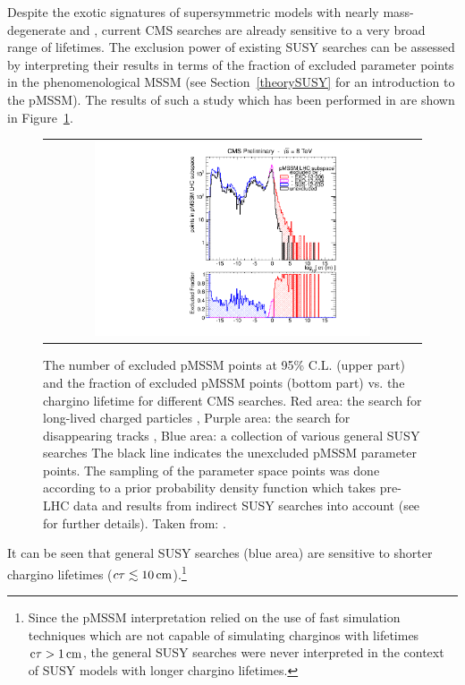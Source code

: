 Despite the exotic signatures of supersymmetric models with nearly mass-degenerate \chipm and \chiO, current CMS searches are already sensitive to a very broad range of lifetimes.
The exclusion power of existing SUSY searches can be assessed by interpreting their results in terms of the fraction of excluded parameter points in the phenomenological MSSM (see Section~\ref{theorySUSY} for an introduction to the pMSSM). 
The results of such a study which has been performed in \cite{bib:CMS:DT_8TeV} are shown in Figure~\ref{fig:pMSSMplot}. 
\begin{figure}[!t]
\vspace{20pt}
  \centering 
  \begin{tabular}{c}
    \includegraphics[width=0.75\textwidth]{figures/analysis/pMSSM_vs_ctau.pdf}
  \end{tabular}
  \caption{The number of excluded pMSSM points at 95\% C.L. (upper part) and the fraction of excluded pMSSM points (bottom part) vs. the chargino lifetime for different CMS searches.
           Red area: the search for long-lived charged particles \cite{bib:CMS:HSCP_8TeV},
           Purple area: the search for disappearing tracks  \cite{bib:CMS:DT_8TeV},
           Blue area: a collection of various general SUSY searches \cite{bib:CMS:pMSSMinterpretation_7TeV_PAS}
           The black line indicates the unexcluded pMSSM parameter points.
           The sampling of the parameter space points was done according to a prior probability density function which takes pre-LHC data and results from indirect SUSY searches into account (see \cite{bib:CMS:HSCPReinterpreation_PAS} for further details).
           Taken from: \cite{bib:pMSSMplot_source_from_DT}.}
  \label{fig:pMSSMplot}
\vspace{20pt}
\end{figure}
It can be seen that general SUSY searches (blue area) are sensitive to shorter chargino lifetimes ($c\tau \lesssim 10\,\text{cm}$).\footnote{Since the pMSSM interpretation relied on the use of fast simulation techniques which are not capable of simulating charginos with lifetimes $\text{c}\tau>1\,\text{cm}$, the general SUSY searches were never interpreted in the context of SUSY models with longer chargino lifetimes.} 
